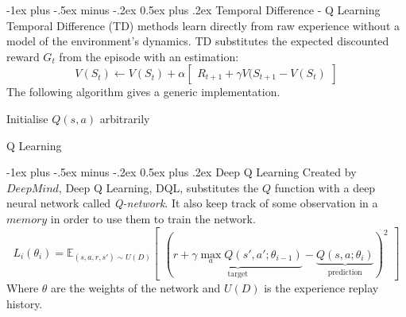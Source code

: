 \documentclass[10pt,landscape]{article}
\makeatletter
\renewcommand{\section}{\@startsection{section}{1}{0mm}%
                                {-1ex plus -.5ex minus -.2ex}%
                                {0.5ex plus .2ex}%
                                {\normalfont\large\bfseries}}
\makeatother
\begin{document}
\begin{multicols}{3}
\section{Temporal Difference - Q Learning}
Temporal Difference (TD) methods learn directly from raw experience without a model of the environment's dynamics. TD substitutes the expected discounted reward $G_t$ from the episode with an estimation:
\begin{equation}
V(S_t) \leftarrow V(S_t) + \alpha \begin{bmatrix}
 R_{t + 1} + \gamma V(S_{t+1} - V(S_t)
\end{bmatrix}
\end{equation}
The following algorithm gives a generic implementation.
\begin{algorithm}[H]
 Initialise $Q(s,a)$ arbitrarily \\
\caption{Q Learning}
\end{algorithm}


\section{Deep Q Learning}
Created by $DeepMind$, Deep Q Learning, DQL, substitutes the $Q$ function with a deep neural network called \emph{Q-network}. It also keep track of some observation in a $memory$ in order to use them to train the network.
\begin{equation}
L_i(\theta_i) = \mathbb{E}_{(s, a, r, s') \sim U(D)}\begin{bmatrix}
        ( \underbrace{r + \gamma \max\limits_a Q(s',a'; \theta_{i-1})}_\text{target} - \underbrace{Q(s,a;\theta_i)}_\text{prediction})^2
\end{bmatrix}
\end{equation}
Where $\theta$ are the weights of the network and $U(D)$ is the experience replay history.


\end{multicols}
\end{document}
